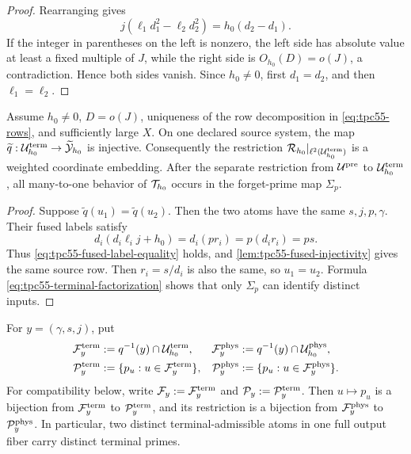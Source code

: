 \begin{proof}
Rearranging gives
\begin{equation}
 j(\ell_1d_1^2-\ell_2d_2^2)=h_0(d_2-d_1).
 \label{eq:tpc55-fused-injectivity-equation}
\end{equation}
If the integer in parentheses on the left is nonzero, the left side has
absolute value at least a fixed multiple of \(J\), while the right side is
\(O_{h_0}(D)=o(J)\), a contradiction.  Hence both sides vanish.  Since
\(h_0\ne0\), first \(d_1=d_2\), and then \(\ell_1=\ell_2\).
\end{proof}

\begin{theorem}
\label{thm:tpc55-prime-resolved-injection}
Assume \(h_0\ne0\), \(D=o(J)\), uniqueness of the row decomposition in
\eqref{eq:tpc55-rows}, and sufficiently large \(X\).  On one declared
source system, the map
\(\widetilde q:\mathcal U_{h_0}^{\rm term}\to\widetilde{\mathcal Y}_{h_0}\) is
injective.  Consequently the restriction
\(\mathcal R_{h_0}|_{\ell^2(\mathcal U_{h_0}^{\rm term})}\) is a weighted coordinate
embedding.  After the separate restriction from \(\mathcal U^{\rm pre}\) to
\(\mathcal U_{h_0}^{\rm term}\), all many-to-one behavior of \(\mathcal T_{h_0}\)
occurs in the forget-prime map \(\Sigma_p\).
\end{theorem}

\begin{proof}
Suppose \(\widetilde q(u_1)=\widetilde q(u_2)\).  Then the two atoms have
the same \(s,j,p,\gamma\).  Their fused labels satisfy
\[
 d_i(d_i\ell_i j+h_0)
 =d_i(p r_i)=p(d_ir_i)=ps.
\]
Thus \eqref{eq:tpc55-fused-label-equality} holds, and
\cref{lem:tpc55-fused-injectivity} gives the same source row.  Then
\(r_i=s/d_i\) is also the same, so \(u_1=u_2\).  Formula
\eqref{eq:tpc55-terminal-factorization} shows that only \(\Sigma_p\) can
identify distinct inputs.
\end{proof}

\begin{corollary}
\label{cor:tpc55-fiber-prime-bijection}
For \(y=(\gamma,s,j)\), put
\begin{equation}
 \begin{aligned}
 \mathcal F_y^{\rm term}&:=q^{-1}(y)\cap\mathcal U_{h_0}^{\rm term},&
 \mathcal F_y^{\rm phys}&:=q^{-1}(y)\cap\mathcal U_{h_0}^{\rm phys},\\
 \mathcal P_y^{\rm term}&:=\{p_u:u\in\mathcal F_y^{\rm term}\},&
 \mathcal P_y^{\rm phys}&:=\{p_u:u\in\mathcal F_y^{\rm phys}\}.
 \end{aligned}
 \label{eq:tpc55-fiber-and-primes}
\end{equation}
For compatibility below, write
\(\mathcal F_y:=\mathcal F_y^{\rm term}\) and
\(\mathcal P_y:=\mathcal P_y^{\rm term}\).  Then \(u\mapsto p_u\) is a bijection from
\(\mathcal F_y^{\rm term}\) to \(\mathcal P_y^{\rm term}\), and its restriction is a
bijection from \(\mathcal F_y^{\rm phys}\) to \(\mathcal P_y^{\rm phys}\).  In
particular, two distinct terminal-admissible atoms in one full output
fiber carry distinct terminal primes.
\end{corollary}

